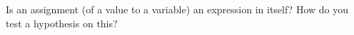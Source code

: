 Is an assignment (of a value to a variable) an expression in itself? How do you test a hypothesis on this?
